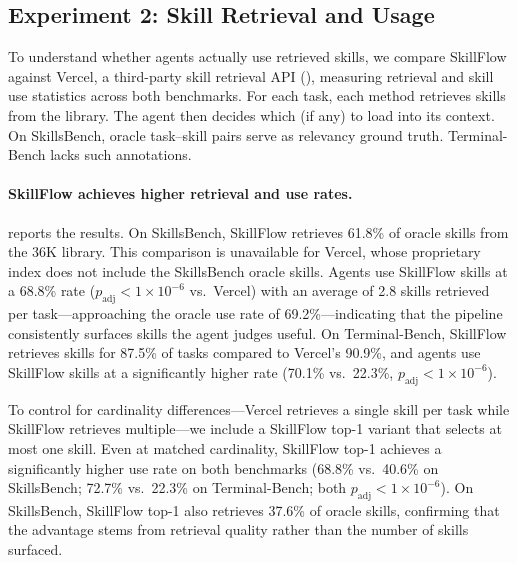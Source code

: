 \documentclass[11pt]{article}
\begin{document}
\subsection{Experiment 2: Skill Retrieval and Usage}
\label{sec:experiment_adoption}

To understand whether agents actually use retrieved skills, we compare SkillFlow against Vercel, a third-party skill retrieval API (), measuring retrieval and skill use statistics across both benchmarks.
For each task, each method retrieves skills from the library. The agent then decides which (if any) to load into its context.
On SkillsBench, oracle task--skill pairs serve as relevancy ground truth. Terminal-Bench lacks such annotations.

\begin{table}[t]
  \centering
  \caption{Skill retrieval and agent use statistics.
  Tasks Retrieved: percentage of tasks for which $\geq$1 skill was retrieved.
  Oracle Skills Retrieved: percentage of oracle skills retrieved from the library.
  Tasks Used: percentage of tasks where the agent used $\geq$1 retrieved skill.
  Vercel maintains its own proprietary skill index that does not include SkillsBench oracle skills.
  Terminal-Bench does not provide oracle skill assignments.
  $^{*}p_{\text{adj}}<0.05$; $^{**}p_{\text{adj}}<0.01$ on Tasks Used vs.\ Vercel baseline.}
  \label{tab:adoption}
  
\end{table}

\paragraph{SkillFlow achieves higher retrieval and use rates.}
 reports the results.
On SkillsBench, SkillFlow retrieves 61.8\% of oracle skills from the 36K library.
This comparison is unavailable for Vercel, whose proprietary index does not include the SkillsBench oracle skills.
Agents use SkillFlow skills at a 68.8\% rate ($p_{\text{adj}} < 1 \times 10^{-6}$ vs.\ Vercel) with an average of 2.8 skills retrieved per task---approaching the oracle use rate of 69.2\%---indicating that the pipeline consistently surfaces skills the agent judges useful.
On Terminal-Bench, SkillFlow retrieves skills for 87.5\% of tasks compared to Vercel's 90.9\%, and agents use SkillFlow skills at a significantly higher rate (70.1\% vs.\ 22.3\%, $p_{\text{adj}} < 1 \times 10^{-6}$).

To control for cardinality differences---Vercel retrieves a single skill per task while SkillFlow retrieves multiple---we include a SkillFlow top-1 variant that selects at most one skill.
Even at matched cardinality, SkillFlow top-1 achieves a significantly higher use rate on both benchmarks (68.8\% vs.\ 40.6\% on SkillsBench; 72.7\% vs.\ 22.3\% on Terminal-Bench; both $p_{\text{adj}} < 1 \times 10^{-6}$).
On SkillsBench, SkillFlow top-1 also retrieves 37.6\% of oracle skills, confirming that the advantage stems from retrieval quality rather than the number of skills surfaced.
\end{document}
